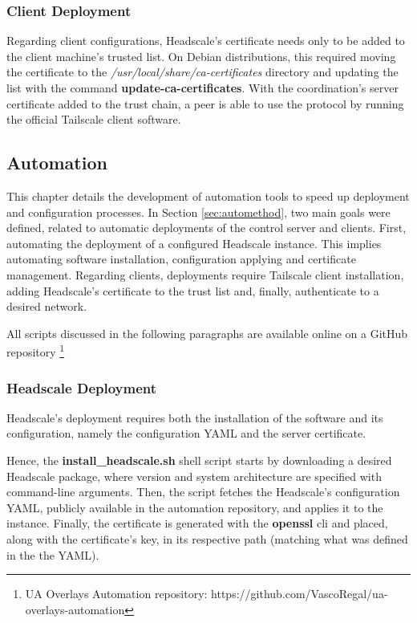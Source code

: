 \documentclass[11pt,twoside,a4paper]{report}
\begin{document}
\subsubsection{Client Deployment}

Regarding client configurations, Headscale's certificate needs only to be added to the client machine's trusted list. On Debian distributions, this required moving the certificate to the \emph{/usr/local/share/ca-certificates} directory and updating the list with the command \textbf{update-ca-certificates}. With the coordination's server certificate added to the trust chain, a peer is able to use the protocol by running the official Tailscale client software.

\subsection{Automation}

This chapter details the development of automation tools to speed up deployment and configuration processes. In Section \ref{sec:automethod}, two main goals were defined, related to automatic deployments of the control server and clients. First, automating the deployment of a configured Headscale instance. This implies automating software installation, configuration applying and certificate management. Regarding clients, deployments require Tailscale client installation, adding Headscale's certificate to the trust list and, finally, authenticate to a desired network.

All scripts discussed in the following paragraphs are available online on a GitHub repository \footnote{UA Overlays Automation repository: https://github.com/VascoRegal/ua-overlays-automation}

\subsubsection{Headscale Deployment}

Headscale's deployment requires both the installation of the software and its configuration, namely the configuration YAML and the server certificate.

Hence, the \textbf{install\_headscale.sh} shell script starts by downloading a desired Headscale package, where version and system architecture are specified with command-line arguments. Then, the script fetches the Headscale's configuration YAML, publicly available in the automation repository, and applies it to the instance. Finally, the certificate is generated with the \textbf{openssl} \ac{cli} and placed, along with the certificate's key, in its respective path (matching what was defined in the the YAML).
\end{document}
